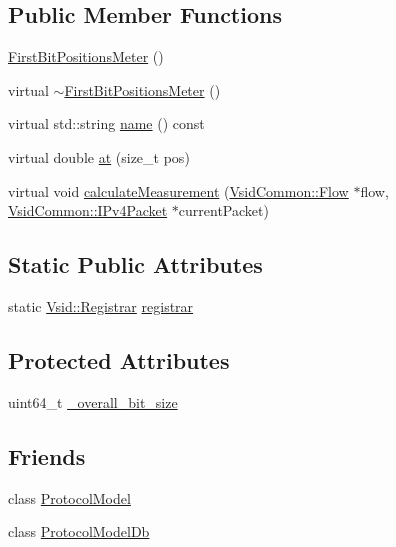 \subsection*{Public Member Functions}
\begin{DoxyCompactItemize}
\item 
\hyperlink{class_vsid_1_1_first_bit_positions_meter_affa1d6ec7d06905d67bcd0fc1e0d2ea7}{First\-Bit\-Positions\-Meter} ()
\item 
virtual \hyperlink{class_vsid_1_1_first_bit_positions_meter_a9971989d8f4082ee9fb1d67d8d1ba151}{$\sim$\-First\-Bit\-Positions\-Meter} ()
\item 
virtual std\-::string \hyperlink{class_vsid_1_1_first_bit_positions_meter_afaca2ad43403ff1bea08d64a8e584197}{name} () const 
\item 
virtual double \hyperlink{class_vsid_1_1_first_bit_positions_meter_a4660f82419be36294df0ca50713da70f}{at} (size\-\_\-t pos)
\item 
virtual void \hyperlink{class_vsid_1_1_first_bit_positions_meter_a516fe18ee500c57c6c5fa2f51091b88a}{calculate\-Measurement} (\hyperlink{class_vsid_common_1_1_flow}{Vsid\-Common\-::\-Flow} $\ast$flow, \hyperlink{class_vsid_common_1_1_i_pv4_packet}{Vsid\-Common\-::\-I\-Pv4\-Packet} $\ast$current\-Packet)
\end{DoxyCompactItemize}
\subsection*{Static Public Attributes}
\begin{DoxyCompactItemize}
\item 
static \hyperlink{class_vsid_1_1_registrar}{Vsid\-::\-Registrar} \hyperlink{class_vsid_1_1_first_bit_positions_meter_ae142f3b7fd6c6d24baf34114f04520a7}{registrar}
\end{DoxyCompactItemize}
\subsection*{Protected Attributes}
\begin{DoxyCompactItemize}
\item 
uint64\-\_\-t \hyperlink{class_vsid_1_1_first_bit_positions_meter_a2557a44d6bf953c4f352f1e465fb1f43}{\-\_\-overall\-\_\-bit\-\_\-size}
\end{DoxyCompactItemize}
\subsection*{Friends}
\begin{DoxyCompactItemize}
\item 
class \hyperlink{class_vsid_1_1_first_bit_positions_meter_a80219b863d4ff3456933d16bc5f73f45}{Protocol\-Model}
\item 
class \hyperlink{class_vsid_1_1_first_bit_positions_meter_a3c0d389e7a9476b06313d8fb9ca9fe68}{Protocol\-Model\-Db}
\end{DoxyCompactItemize}


